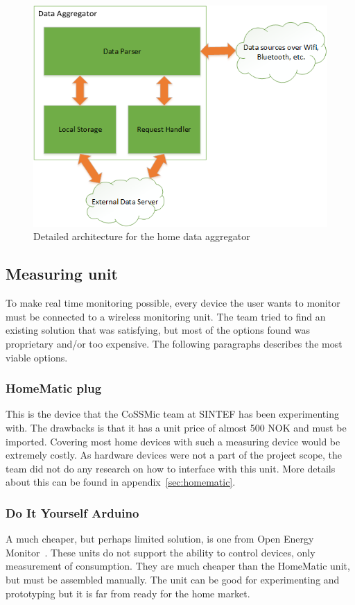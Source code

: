 \begin{figure}[H]
\centering
\includegraphics[width=\textwidth]{ch/further/fig/home.png}
\caption{Detailed architecture for the home data aggregator}
\label{fig:aggregator}
\end{figure}

\subsection{Measuring unit}
To make real time monitoring possible, every device the user wants to monitor must be connected to a wireless monitoring unit. The team tried to find an existing solution that was satisfying, but most of the options found was proprietary and/or too expensive. The following paragraphs describes the most viable options.

\subsubsection{HomeMatic plug}
This is the device that the CoSSMic team at SINTEF has been experimenting with. The drawbacks is that it has a unit price of almost 500 NOK and must be imported. Covering most home devices with such a measuring device would be extremely costly. As hardware devices were not a part of the project scope, the team did not do any research on how to interface with this unit. More details about this can be found in appendix~\ref{sec:homematic}.

\subsubsection{Do It Yourself Arduino}
A much cheaper, but perhaps limited solution, is one from Open Energy Monitor~\cite{oemmodule}. These units do not support the ability to control devices, only measurement of consumption. They are much cheaper than the HomeMatic unit, but must be assembled manually. The unit can be good for experimenting and prototyping but it is far from ready for the home market.


